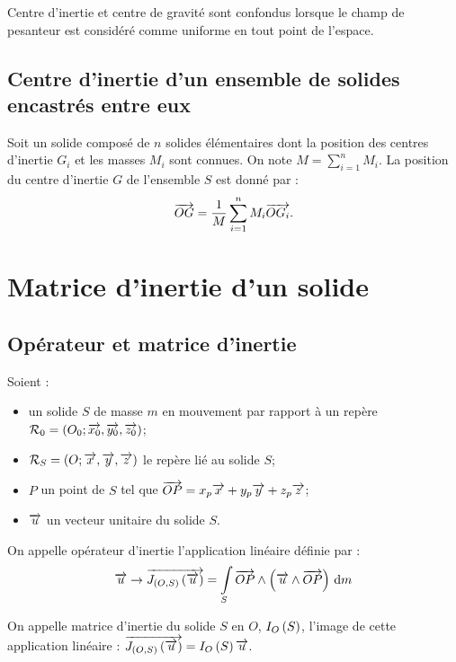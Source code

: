 \documentclass[10pt,fleqn]{article} %
\begin{document}
\begin{rem}
Centre d'inertie et centre de gravité sont confondus lorsque le champ de pesanteur est considéré comme uniforme en tout point de l'espace. 
\end{rem}

\subsection{Centre d'inertie d'un ensemble de solides encastrés entre eux}
\begin{methode}
Soit un solide composé de $n$ solides élémentaires dont la position des centres d'inertie $G_i$ et les masses $M_i$ sont connues. On note $M=\sum\limits_{i=1}^{n}M_i$.  La position du centre d'inertie $G$ de l'ensemble $S$ est donné par :
$$\overrightarrow{OG}=\dfrac{1}{M}\sum\limits_{i=1}^{n}M_i \overrightarrow{OG_i} .$$

\end{methode}



\section{Matrice d'inertie d'un solide}
\subsection{Opérateur et matrice d'inertie}

\begin{defi}
Soient : 
\begin{itemize}
\item un solide $S$ de masse $m$ en mouvement par rapport à un repère $\mathcal{R}_0=\left(O_0;\overrightarrow{x_0},\overrightarrow{y_0},\overrightarrow{z_0} \right)$;
\item $\mathcal{R}_S=\left(O;\overrightarrow{x},\overrightarrow{y},\overrightarrow{z} \right)$ le repère lié au solide $S$;
\item $P$ un point de $S$ tel que $\overrightarrow{OP}=x_p\overrightarrow{x}+y_p\overrightarrow{y}+z_p\overrightarrow{z}$;
\item $\overrightarrow{u}$ un vecteur unitaire du solide $S$.
\end{itemize}

On appelle opérateur d'inertie l'application linéaire définie par :
$$
\overrightarrow{u} \rightarrow \overrightarrow{J_{\left(O,S\right)}\left(\overrightarrow{u}\right)} 
= \int\limits_{S} \overrightarrow{OP}\wedge \left(\overrightarrow{u}\wedge \overrightarrow{OP}\right)\,\text{d} m
$$

On appelle matrice d'inertie du solide $S$ en $O$, $I_{O}\left( S\right)$, l'image de cette application linéaire : $\overrightarrow{J_{\left(O,S\right)}\left(\overrightarrow{u}\right)}  = I_{O}\left( S\right) \overrightarrow{u}$.
 
\end{defi}
\end{document}
